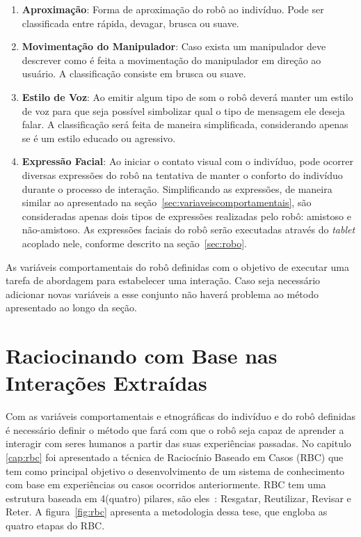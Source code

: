\begin{enumerate}
	\item \textbf{Aproximação}: Forma de aproximação do robô ao indivíduo. Pode ser classificada entre rápida, devagar, brusca ou suave.
	\item \textbf{Movimentação do Manipulador}: Caso exista um manipulador deve descrever como é feita a movimentação do manipulador em direção ao usuário. A classificação consiste em brusca ou suave.
	\item \textbf{Estilo de Voz}: Ao emitir algum tipo de som o robô deverá manter um estilo de voz para que seja possível simbolizar qual o tipo de mensagem ele deseja falar. A classificação será feita de maneira simplificada, considerando apenas se é um estilo educado ou agressivo.
	\item \textbf{Expressão Facial}: Ao iniciar o contato visual com o indivíduo, pode ocorrer diversas expressões do robô na tentativa de manter o conforto do indivíduo durante o processo de interação. Simplificando as expressões, de maneira similar ao apresentado na seção~\ref{sec:variaveiscomportamentais}, são consideradas apenas dois tipos de expressões realizadas pelo robô: amistoso e não-amistoso. As expressões faciais do robô serão executadas através do \emph{tablet} acoplado nele, conforme descrito na seção~\ref{sec:robo}.
\end{enumerate}

As variáveis comportamentais do robô definidas com o objetivo de executar uma tarefa de abordagem para estabelecer uma interação. Caso seja necessário adicionar novas variáveis a esse conjunto não haverá problema ao método apresentado ao longo da seção.

\section{Raciocinando com Base nas Interações Extraídas}
\label{sec:raciociniointeracao}

Com as variáveis comportamentais e etnográficas do indivíduo e do robô definidas é necessário definir o método que fará com que o robô seja capaz de aprender a interagir com seres humanos a partir das suas experiências passadas. No capitulo \ref{cap:rbc} foi apresentado a técnica de Raciocínio Baseado em Casos (RBC) que tem como principal objetivo o desenvolvimento de um sistema de conhecimento com base em experiências ou casos ocorridos anteriormente. RBC tem uma estrutura baseada em 4(quatro) pilares, são eles~\cite{Lopez:2013}: Resgatar, Reutilizar, Revisar e Reter. A figura~\ref{fig:rbc} apresenta a metodologia dessa tese, que engloba as quatro etapas do RBC.


